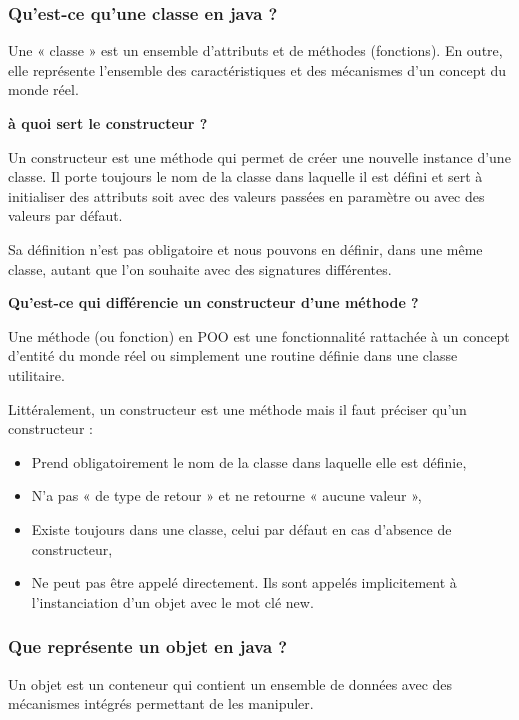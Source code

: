 \documentclass[11pt,twoside,a4paper]{article}
\begin{document}
\begin{landscape}
\begin{multicols}{2}
\subsubsection*{Qu'est-ce qu'une classe en java ?}

Une « classe » est un ensemble d'attributs et de m{\'e}thodes (fonctions). En outre, elle repr{\'e}sente l'ensemble des caract{\'e}ristiques et des m{\'e}canismes d'un concept du monde r{\'e}el.

\textbf{{\`a} quoi sert le constructeur ?}

Un constructeur est une m{\'e}thode qui permet de cr{\'e}er une nouvelle instance d'une classe. Il porte toujours le nom de la classe dans laquelle il est d{\'e}fini et sert {\`a} initialiser des attributs soit avec des valeurs pass{\'e}es en param{\`e}tre ou avec des valeurs par d{\'e}faut.

Sa d{\'e}finition n'est pas obligatoire et nous pouvons en d{\'e}finir, dans une m{\^e}me classe, autant que l'on souhaite avec des signatures diff{\'e}rentes.

\textbf{Qu'est-ce qui diff{\'e}rencie un constructeur d'une m{\'e}thode ?}

Une m{\'e}thode (ou fonction) en POO est une fonctionnalit{\'e} rattach{\'e}e {\`a} un concept d'entit{\'e} du monde r{\'e}el ou simplement une routine d{\'e}finie dans une classe utilitaire.

Litt{\'e}ralement, un constructeur est une m{\'e}thode mais il faut pr{\'e}ciser qu'un constructeur :
\begin{itemize}
	\item Prend obligatoirement le nom de la classe dans laquelle elle est d{\'e}finie,
	\item N'a pas « de type de retour » et ne retourne « aucune valeur »,
	\item Existe toujours dans une classe, celui par d{\'e}faut en cas d'absence de constructeur,
	\item Ne peut pas {\^e}tre appel{\'e} directement. Ils sont appel{\'e}s implicitement {\`a} l'instanciation d'un objet avec le mot cl{\'e} new.
\end{itemize}

\subsubsection*{Que repr{\'e}sente un objet en java ?}

Un objet est un conteneur qui contient un ensemble de donn{\'e}es avec des m{\'e}canismes int{\'e}gr{\'e}s permettant de les manipuler.


\end{multicols}
\end{landscape}
\end{document}
